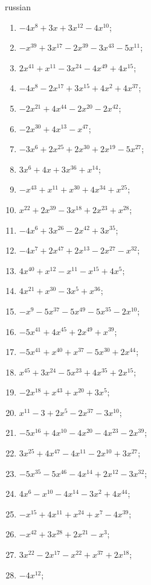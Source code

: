 \documentclass[a4paper]{article}
\begin{document}
\begin{otherlanguage*}{russian}
\begin{enumerate}
\item $-4x^8 + 3x + 3x^12 - 4x^10$;
\item $-x^39 + 3x^17 - 2x^39 - 3x^43 - 5x^11$;
\item $2x^41 + x^11 - 3x^24 - 4x^49 + 4x^15$;
\item $-4x^8 - 2x^17 + 3x^15 + 4x^2 + 4x^37$;
\item $-2x^21 + 4x^44 - 2x^20 - 2x^42$;
\item $-2x^30 + 4x^13 - x^47$;
\item $-3x^6 + 2x^25 + 2x^30 + 2x^19 - 5x^27$;
\item $3x^6 + 4x + 3x^36 + x^14$;
\item $-x^43 + x^11 + x^30 + 4x^34 + x^25$;
\item $x^22 + 2x^39 - 3x^18 + 2x^23 + x^28$;
\item $-4x^6 + 3x^26 - 2x^42 + 3x^35$;
\item $-4x^7 + 2x^47 + 2x^13 - 2x^27 - x^32$;
\item $4x^40 + x^12 - x^11 - x^15 + 4x^5$;
\item $4x^21 + x^30 - 3x^5 + x^36$;
\item $-x^9 - 5x^37 - 5x^49 - 5x^35 - 2x^10$;
\item $-5x^41 + 4x^45 + 2x^49 + x^39$;
\item $-5x^41 + x^40 + x^37 - 5x^30 + 2x^44$;
\item $x^45 + 3x^24 - 5x^23 + 4x^35 + 2x^15$;
\item $-2x^18 + x^43 + x^20 + 3x^5$;
\item $x^11 - 3 + 2x^5 - 2x^37 - 3x^10$;
\item $-5x^16 + 4x^10 - 4x^20 - 4x^23 - 2x^39$;
\item $3x^25 + 4x^47 - 4x^11 - 2x^10 + 3x^27$;
\item $-5x^35 - 5x^46 - 4x^14 + 2x^12 - 3x^32$;
\item $4x^6 - x^10 - 4x^14 - 3x^2 + 4x^44$;
\item $-x^15 + 4x^11 + x^24 + x^7 - 4x^39$;
\item $-x^42 + 3x^28 + 2x^21 - x^3$;
\item $3x^22 - 2x^17 - x^22 + x^37 + 2x^18$;
\item $-4x^12$;
\end{enumerate}
\end{otherlanguage*}
\end{document}
